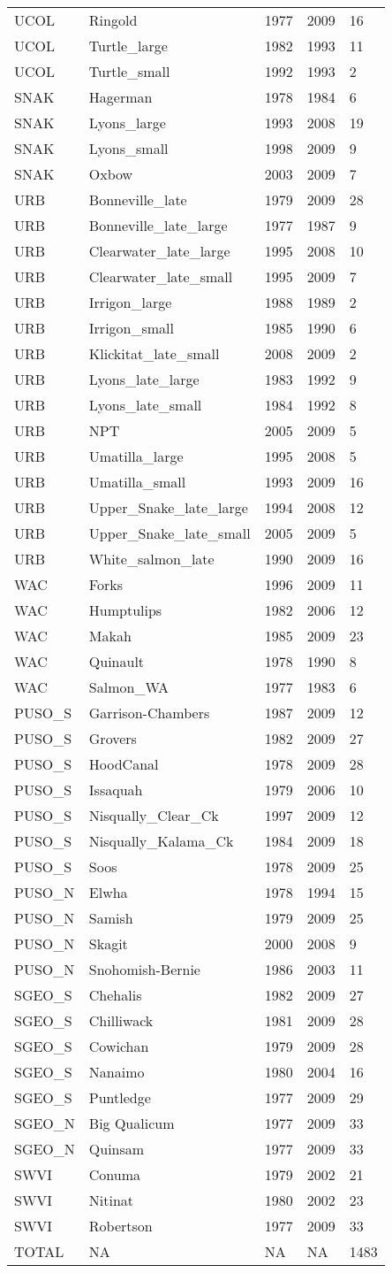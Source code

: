 \documentclass[]{article}
\begin{document}
\begin{longtable}[]{@{}lllll@{}}
UCOL & Ringold & 1977 & 2009 & 16\tabularnewline
UCOL & Turtle\_large & 1982 & 1993 & 11\tabularnewline
UCOL & Turtle\_small & 1992 & 1993 & 2\tabularnewline
SNAK & Hagerman & 1978 & 1984 & 6\tabularnewline
SNAK & Lyons\_large & 1993 & 2008 & 19\tabularnewline
SNAK & Lyons\_small & 1998 & 2009 & 9\tabularnewline
SNAK & Oxbow & 2003 & 2009 & 7\tabularnewline
URB & Bonneville\_late & 1979 & 2009 & 28\tabularnewline
URB & Bonneville\_late\_large & 1977 & 1987 & 9\tabularnewline
URB & Clearwater\_late\_large & 1995 & 2008 & 10\tabularnewline
URB & Clearwater\_late\_small & 1995 & 2009 & 7\tabularnewline
URB & Irrigon\_large & 1988 & 1989 & 2\tabularnewline
URB & Irrigon\_small & 1985 & 1990 & 6\tabularnewline
URB & Klickitat\_late\_small & 2008 & 2009 & 2\tabularnewline
URB & Lyons\_late\_large & 1983 & 1992 & 9\tabularnewline
URB & Lyons\_late\_small & 1984 & 1992 & 8\tabularnewline
URB & NPT & 2005 & 2009 & 5\tabularnewline
URB & Umatilla\_large & 1995 & 2008 & 5\tabularnewline
URB & Umatilla\_small & 1993 & 2009 & 16\tabularnewline
URB & Upper\_Snake\_late\_large & 1994 & 2008 & 12\tabularnewline
URB & Upper\_Snake\_late\_small & 2005 & 2009 & 5\tabularnewline
URB & White\_salmon\_late & 1990 & 2009 & 16\tabularnewline
WAC & Forks & 1996 & 2009 & 11\tabularnewline
WAC & Humptulips & 1982 & 2006 & 12\tabularnewline
WAC & Makah & 1985 & 2009 & 23\tabularnewline
WAC & Quinault & 1978 & 1990 & 8\tabularnewline
WAC & Salmon\_WA & 1977 & 1983 & 6\tabularnewline
PUSO\_S & Garrison-Chambers & 1987 & 2009 & 12\tabularnewline
PUSO\_S & Grovers & 1982 & 2009 & 27\tabularnewline
PUSO\_S & HoodCanal & 1978 & 2009 & 28\tabularnewline
PUSO\_S & Issaquah & 1979 & 2006 & 10\tabularnewline
PUSO\_S & Nisqually\_Clear\_Ck & 1997 & 2009 & 12\tabularnewline
PUSO\_S & Nisqually\_Kalama\_Ck & 1984 & 2009 & 18\tabularnewline
PUSO\_S & Soos & 1978 & 2009 & 25\tabularnewline
PUSO\_N & Elwha & 1978 & 1994 & 15\tabularnewline
PUSO\_N & Samish & 1979 & 2009 & 25\tabularnewline
PUSO\_N & Skagit & 2000 & 2008 & 9\tabularnewline
PUSO\_N & Snohomish-Bernie & 1986 & 2003 & 11\tabularnewline
SGEO\_S & Chehalis & 1982 & 2009 & 27\tabularnewline
SGEO\_S & Chilliwack & 1981 & 2009 & 28\tabularnewline
SGEO\_S & Cowichan & 1979 & 2009 & 28\tabularnewline
SGEO\_S & Nanaimo & 1980 & 2004 & 16\tabularnewline
SGEO\_S & Puntledge & 1977 & 2009 & 29\tabularnewline
SGEO\_N & Big Qualicum & 1977 & 2009 & 33\tabularnewline
SGEO\_N & Quinsam & 1977 & 2009 & 33\tabularnewline
SWVI & Conuma & 1979 & 2002 & 21\tabularnewline
SWVI & Nitinat & 1980 & 2002 & 23\tabularnewline
SWVI & Robertson & 1977 & 2009 & 33\tabularnewline
TOTAL & NA & NA & NA & 1483\tabularnewline
\bottomrule
\end{longtable}
\end{document}
